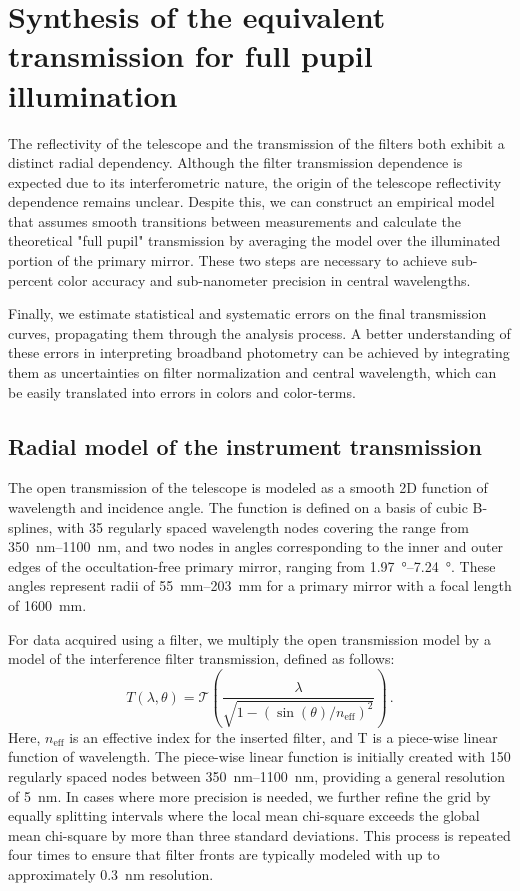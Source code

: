 \section{Synthesis of the equivalent transmission for full pupil illumination}
\label{sec:pupil_stitching}

The reflectivity of the telescope and the transmission of the filters
both exhibit a distinct radial dependency. Although the filter
transmission dependence is expected due to its interferometric nature,
the origin of the telescope reflectivity dependence remains
unclear. Despite this, we can construct an empirical model that
assumes smooth transitions between measurements and calculate the
theoretical "full pupil" transmission by averaging the model over the
illuminated portion of the primary mirror. These two steps are
necessary to achieve sub-percent color accuracy and sub-nanometer
precision in central wavelengths.

Finally, we estimate statistical and systematic errors on the final
transmission curves, propagating them through the analysis process. A
better understanding of these errors in interpreting broadband
photometry can be achieved by integrating them as uncertainties on
filter normalization and central wavelength, which can be easily
translated into errors in colors and color-terms.


\subsection{Radial model of the instrument transmission}
\label{sec:model}

The open transmission of the telescope is modeled as a smooth 2D
function of wavelength and incidence angle. The function is defined on
a basis of cubic B-splines, with \num{35} regularly spaced wavelength
nodes covering the range from \SIrange{350}{1100}{nm}, and two nodes
in angles corresponding to the inner and outer edges of the
occultation-free primary mirror, ranging from \SIrange{1.97}{7.24}
{\degree}. These angles represent radii of \SIrange{55}{203}{mm} for a
primary mirror with a focal length of \SI{1600}{mm}.

For data acquired using a filter, we multiply the open transmission
model by a model of the interference filter transmission, defined as
follows:
\begin{equation}
  \label{eq:filtertransmission}
T(\lambda, \theta) = \mathcal T\left(\frac{\lambda}{\sqrt{1 -
    (\sin(\theta) / n_\text{eff})^2}}\right)\,.
\end{equation}
Here, $n_\text{eff}$ is an effective index for the inserted filter,
and T is a piece-wise linear function of wavelength. The piece-wise
linear function is initially created with \num{150} regularly spaced
nodes between \SIrange{350}{1100}{nm}, providing a general resolution
of \SI{5}{nm}. In cases where more precision is needed, we further
refine the grid by equally splitting intervals where the local mean
chi-square exceeds the global mean chi-square by more than three
standard deviations. This process is repeated four times to ensure
that filter fronts are typically modeled with up to approximately
\SI{0.3}{nm} resolution.


